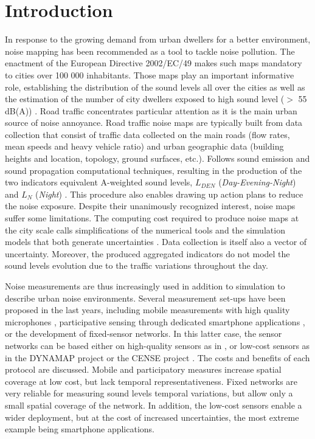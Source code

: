\documentclass[review,5p,twocolumn,sort&compress,times]{elsarticle}
\begin{document}
\section{Introduction}

In response to the growing demand from urban dwellers for a better environment, noise mapping has been recommended as a tool to tackle noise pollution. The enactment of the European Directive 2002/EC/49 makes such maps mandatory to cities over 100 000 inhabitants. Those maps play an important informative role, establishing the distribution of the sound levels all over the cities as well as the estimation of the number of city dwellers exposed to high sound level ($>$ 55 dB(A)) \cite{nugent2014noise}. Road traffic concentrates particular attention as it is the main urban source of noise annoyance. Road traffic noise maps are typically built from data collection that consist of traffic data collected on the main roads (flow rates, mean speeds and heavy vehicle ratio) and urban geographic data (building heights and location, topology, ground surfaces, etc.). Follows sound emission and sound propagation computational techniques, resulting in the production of the two indicators equivalent A-weighted sound levels, $L_{DEN}$ (\textit{Day-Evening-Night}) and $L_N$ (\textit{Night}) \cite{kephalopoulos2012common}. This procedure also enables drawing up action plans to reduce the noise exposure. Despite their unanimously recognized interest, noise maps suffer some limitations. The computing cost required to produce noise maps at the city scale calls simplifications of the numerical tools and the simulation models that both generate uncertainties \cite{van_leeuwen_noise_2015}. Data collection is itself also a vector of uncertainty. Moreover, the produced aggregated indicators do not model the sound levels evolution due to the traffic variations throughout the day.

Noise measurements are thus increasingly used in addition to simulation to describe urban noise environments. Several measurement set-ups have been proposed in the last years, including  mobile measurements with high quality microphones \cite{manvell2004sadmam, can2014measurement}, participative sensing through dedicated smartphone applications \cite{picaut:halshs-01565214, ventura2017evaluation}, or the development of fixed-sensor networks. In this latter case, the sensor networks can be based either on high-quality sensors as in \cite{mietlicki2012innovative, maijala2018environmental}, or low-cost sensors as in the DYNAMAP project \cite{dynamap_2016} or the CENSE project \cite{picaut2017characterization}. The costs and benefits of each protocol are discussed. Mobile and participatory measures increase spatial coverage at low cost, but lack temporal representativeness. Fixed networks are very reliable for measuring sound levels temporal variations, but allow only a small spatial coverage of the network. In addition, the low-cost sensors enable a wider deployment, but at the cost of increased uncertainties, the most extreme example being smartphone applications.
\end{document}
